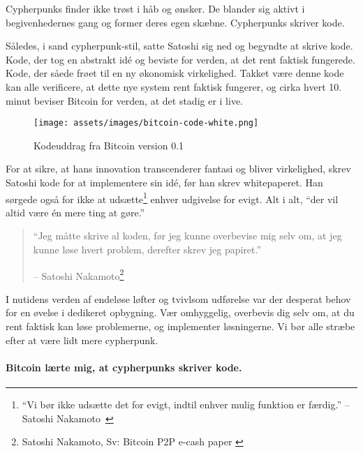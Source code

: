 Cypherpunks finder ikke trøst i håb og ønsker. De blander sig aktivt
i begivenhedernes gang og former deres egen skæbne.
Cypherpunks skriver kode.

Således, i sand cypherpunk-stil, satte Satoshi sig ned og begyndte at skrive
kode. Kode, der tog en abstrakt idé og beviste for verden, at det rent 
faktisk fungerede. Kode, der såede frøet til en ny økonomisk virkelighed.
Takket være denne kode kan alle verificere, at dette nye system rent faktisk
fungerer, og cirka hvert 10. minut beviser Bitcoin for verden, at det stadig 
er i live.

\begin{figure}[htbp]
  \centering
  \texttt{[image: assets/images/bitcoin-code-white.png]}
  \caption{Kodeuddrag fra Bitcoin version 0.1}
  \label{fig:bitcoin-code-white}
\end{figure}

For at sikre, at hans innovation transcenderer fantasi og bliver virkelighed,
skrev Satoshi kode for at implementere sin idé, før han skrev whitepaperet. 
Han sørgede også for ikke at udsætte\footnote{\enquote{Vi bør ikke udsætte 
det for evigt, indtil enhver mulig funktion er færdig.} -- 
Satoshi Nakamoto~\cite{satoshi-delay}} enhver udgivelse for evigt.
Alt i alt, \enquote{der vil altid være én mere ting at gøre.}

\begin{quotation}\begin{samepage}
\enquote{Jeg måtte skrive al koden, før jeg kunne overbevise mig selv om, at jeg
kunne løse hvert problem, derefter skrev jeg papiret.}
\begin{flushright} -- Satoshi Nakamoto\footnote{Satoshi Nakamoto, Sv: 
  Bitcoin P2P e-cash paper \cite{satoshi-mail-code-first}}
\end{flushright}\end{samepage}\end{quotation}

I nutidens verden af endeløse løfter og tvivlsom udførelse var der desperat 
behov for en øvelse i dedikeret opbygning. Vær omhyggelig, overbevis
dig selv om, at du rent faktisk kan løse problemerne, og implementer
løsningerne. Vi bør alle stræbe efter at være lidt mere cypherpunk.

\paragraph{Bitcoin lærte mig, at cypherpunks skriver kode.}

%
%
%
%
